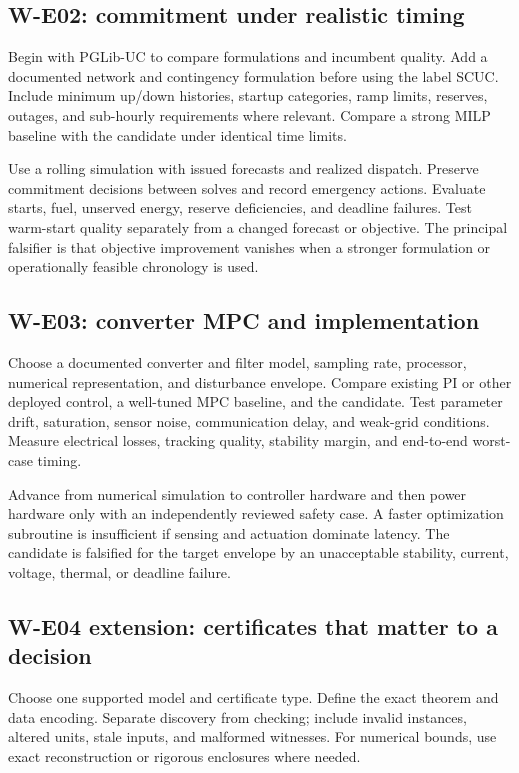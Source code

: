 \documentclass[11pt,letterpaper]{article}
\begin{document}
\subsection{W-E02: commitment under realistic timing}
Begin with PGLib-UC to compare formulations and incumbent quality. Add a documented network and contingency formulation before using the label SCUC. Include minimum up/down histories, startup categories, ramp limits, reserves, outages, and sub-hourly requirements where relevant. Compare a strong MILP baseline with the candidate under identical time limits.

Use a rolling simulation with issued forecasts and realized dispatch. Preserve commitment decisions between solves and record emergency actions. Evaluate starts, fuel, unserved energy, reserve deficiencies, and deadline failures. Test warm-start quality separately from a changed forecast or objective. The principal falsifier is that objective improvement vanishes when a stronger formulation or operationally feasible chronology is used.

\subsection{W-E03: converter MPC and implementation}
Choose a documented converter and filter model, sampling rate, processor, numerical representation, and disturbance envelope. Compare existing PI or other deployed control, a well-tuned MPC baseline, and the candidate. Test parameter drift, saturation, sensor noise, communication delay, and weak-grid conditions. Measure electrical losses, tracking quality, stability margin, and end-to-end worst-case timing.

Advance from numerical simulation to controller hardware and then power hardware only with an independently reviewed safety case. A faster optimization subroutine is insufficient if sensing and actuation dominate latency. The candidate is falsified for the target envelope by an unacceptable stability, current, voltage, thermal, or deadline failure.

\subsection{W-E04 extension: certificates that matter to a decision}
Choose one supported model and certificate type. Define the exact theorem and data encoding. Separate discovery from checking; include invalid instances, altered units, stale inputs, and malformed witnesses. For numerical bounds, use exact reconstruction or rigorous enclosures where needed.
\end{document}
